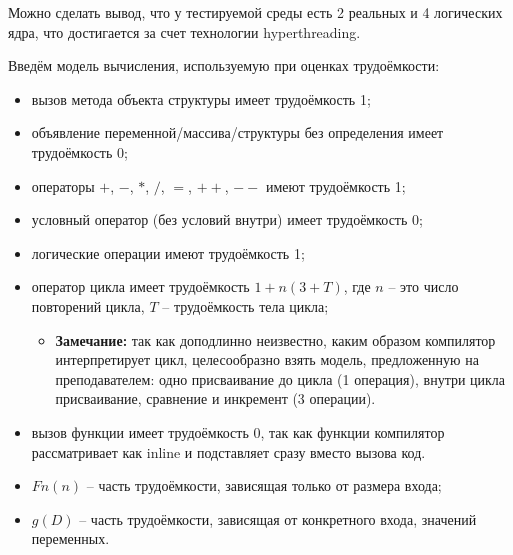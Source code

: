 \documentclass[utf8x, 12pt]{G7-32} %
\begin{document}
Можно сделать вывод, что у тестируемой среды есть 2 реальных и 4 логических ядра, что достигается за счет технологии hyperthreading.

\newpage

Введём модель вычисления, используемую при оценках трудоёмкости:
\begin{itemize}
	\item вызов метода объекта структуры имеет трудоёмкость 1;
	\item объявление переменной/массива/структуры без определения имеет трудоёмкость 0;
	\item операторы $+$, $-$, $*$, $/$, $=$, $++$, $--$ имеют трудоёмкость 1;
	\item условный оператор (без условий внутри) имеет трудоёмкость 0;
	\item логические операции имеют трудоёмкость 1; 
	\item оператор цикла имеет трудоёмкость $1 + n(3 + T)$, где $n$ – это число повторений цикла, $T$ – трудоёмкость тела цикла;
	\begin{itemize}
		\item \textbf{Замечание:} так как доподлинно неизвестно, каким образом компилятор интерпретирует цикл, целесообразно взять модель, предложенную на преподавателем: одно присваивание до цикла (1 операция), внутри цикла присваивание, сравнение и инкремент (3 операции).
	\end{itemize}
	\item вызов функции имеет трудоёмкость 0, так как функции компилятор рассматривает как inline и подставляет сразу вместо вызова код.
	\item $Fn(n)$ – часть трудоёмкости, зависящая только от размера входа;
	\item $g(D)$ – часть трудоёмкости, зависящая от конкретного входа, значений переменных.
\end{itemize}

\newpage
\end{document}
